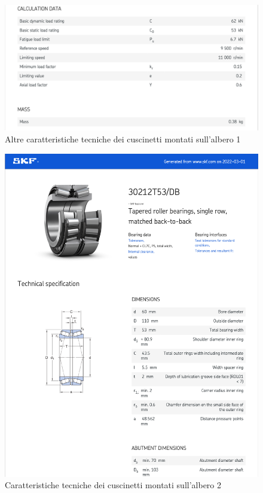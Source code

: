 \newpage
\begin{figure}[h]
    \centering
    \includegraphics[scale=0.6]{Immagini/Cuscinetti2Albero2.png}
    \caption{Altre caratteristiche tecniche dei cuscinetti montati sull'albero 1}
    \label{fig:Cuscinetti2Albero1}
\end{figure}
\newpage
\begin{figure}[h]
    \centering
    \includegraphics[scale=0.6]{Immagini/Cuscinetti3Albero2.png}
    \caption{Caratteristiche tecniche dei cuscinetti montati sull'albero 2}
    \label{fig:Cuscinetti3Albero2}
\end{figure}
